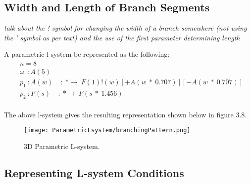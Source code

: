 \begin{flushleft}
\subsection{Width and Length of Branch Segments}

\textit{talk about the ! symbol for changing the width of a branch somewhere (not using the ' symbol as per text) and the use of the first parameter determining length}

A parametric l-system be represented as the following: \\

\begin{equation} \label{parametric l-system practical}
\begin{aligned}
	&n=8 \\
	&\omega~~ : A(5)\\
	&p_1~ :  A(w)~~~~~ :~ * \rightarrow~ F(1)!(w)[+A(w~*~0.707)][-A(w~*~0.707)]\\
	&p_2~ :  F(s)~~~~~ :~ * \rightarrow~ F(s~*~1.456)\\
\end{aligned}
\end{equation}

The above l-system gives the resulting representation shown below in figure 3.8. 

\begin{figure}[htbp]
	{\centering
		\vspace{7px}
		\texttt{[image: ParametricLsystem/branchingPattern.png]}
		\caption{3D Parametric L-system.}
	}
\end{figure}

\FloatBarrier

\end{flushleft}



\subsection{Representing L-system Conditions} \label{Condition L-system Subsection}

